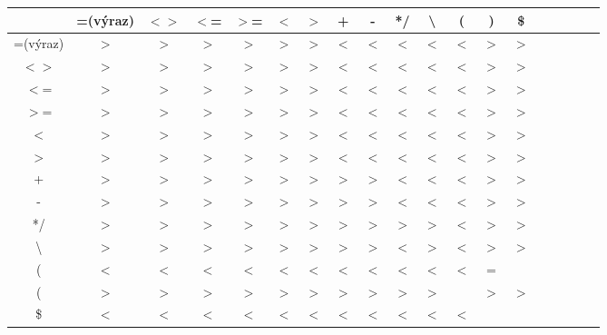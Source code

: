 \documentclass{article}
\begin{document}
        \begin{center}
        \begin{tabular}{|c|c|c|c|c|c|c|c|c|c|c|c|c|c|c|c|c|c|c|}
        \hline
                  & =(výraz) & $<>$ & $<$= & $>$= & $<$ & $>$ &  +  &  -  &  */  & \textbackslash &  (  &  )  & \$  \\ 
        \hline
        =(výraz)  &     $>$  &  $>$ &  $>$ &  $>$ & $>$ & $>$ & $<$ & $<$ &  $<$ & $<$            & $<$ & $>$ & $>$ \\ 
        \hline
          $<>$    &     $>$  &  $>$ &  $>$ &  $>$ & $>$ & $>$ & $<$ & $<$ &  $<$ & $<$            & $<$ & $>$ & $>$ \\
        \hline
          $<$=    &     $>$  &  $>$ &  $>$ &  $>$ & $>$ & $>$ & $<$ & $<$ &  $<$ & $<$            & $<$ & $>$ & $>$ \\
        \hline
          $>$=    &     $>$  &  $>$ &  $>$ &  $>$ & $>$ & $>$ & $<$ & $<$ &  $<$ & $<$            & $<$ & $>$ & $>$ \\
        \hline
          $<$     &     $>$  &  $>$ &  $>$ &  $>$ & $>$ & $>$ & $<$ & $<$ &  $<$ & $<$            & $<$ & $>$ & $>$ \\
        \hline  
          $>$     &     $>$  &  $>$ &  $>$ &  $>$ & $>$ & $>$ & $<$ & $<$ &  $<$ & $<$            & $<$ & $>$ & $>$ \\
        \hline
           +      &     $>$  &  $>$ &  $>$ &  $>$ & $>$ & $>$ & $>$ & $>$ &  $<$ & $<$            & $<$ & $>$ & $>$ \\
        \hline
           -      &     $>$  &  $>$ &  $>$ &  $>$ & $>$ & $>$ & $>$ & $>$ &  $<$ & $<$            & $<$ & $>$ & $>$ \\ 
        \hline
          */      &     $>$  &  $>$ &  $>$ &  $>$ & $>$ & $>$ & $>$ & $>$ &  $>$ & $>$            & $<$ & $>$ & $>$ \\ 
        \hline
\textbackslash    &     $>$  &  $>$ &  $>$ &  $>$ & $>$ & $>$ & $>$ & $>$ &  $<$ & $>$            & $<$ & $>$ & $>$ \\
        \hline
           (      &     $<$  &  $<$ &  $<$ &  $<$ & $<$ & $<$ & $<$ & $<$ &  $<$ & $<$            & $<$ &  =  &     \\  
        \hline
           (      &     $>$  &  $>$ &  $>$ &  $>$ & $>$ & $>$ & $>$ & $>$ &  $>$ & $>$            &     & $>$ & $>$ \\ 
        \hline
          \$      &     $<$  &  $<$ &  $<$ &  $<$ & $<$ & $<$ & $<$ & $<$ &  $<$ & $<$            & $<$ &     &     \\ 
        \hline
        \end{tabular}
    \end{center}
\end{document}
